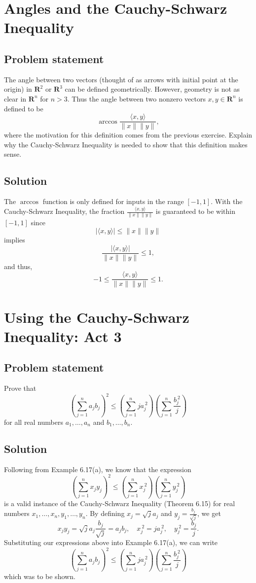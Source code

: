 \documentclass{article}
\providecommand{\abs}[1]{\lvert#1\rvert} \providecommand{\norm}[1]{\lVert#1\rVert}
\begin{document}
\clearpage

\section{Angles and the Cauchy-Schwarz Inequality}
\subsection*{Problem statement}
The angle between two vectors (thought of as arrows with initial point at the origin) in $\mathbf{R}^2$ or $\mathbf{R}^3$ can be defined geometrically. 
However, geometry is not as clear in $\mathbf{R}^n$ for $n>3$. 
Thus the angle between two nonzero vectors $x,y\in\mathbf{R}^n$ is defined to be
\[\arccos\frac{\langle x,y\rangle}{\norm{x}\norm{y}},\]
where the motivation for this definition comes from the previous exercise. 
Explain why the Cauchy-Schwarz Inequality is needed to show that this definition makes sense.

\subsection*{Solution}
The $\arccos$ function is only defined for inputs in the range $[-1,1]$. 
With the Cauchy-Schwarz Inequality, the fraction $\frac{\langle x,y\rangle}{\norm{x}\norm{y}}$ is guaranteed to be within $[-1,1]$ since
\[\abs{\langle x,y\rangle} \leq \norm{x}\norm{y}\]
implies
\[\frac{\abs{\langle x,y\rangle}}{\norm{x}\norm{y}}\leq 1,\]
and thus,
\[-1\leq \frac{\langle x,y\rangle}{\norm{x}\norm{y}} \leq 1.\]

\clearpage

\section{Using the Cauchy-Schwarz Inequality: Act 3}
\subsection*{Problem statement}
Prove that
\[(\sum^{n}_{j=1}a_jb_j)^2\leq (\sum^{n}_{j=1}ja_j^{\:2})(\sum^{n}_{j=1}\frac{b_j^{\:2}}{j})\]
for all real numbers $a_1,\ldots,a_n$ and $b_1,\ldots,b_n$.

\subsection*{Solution}
Following from Example 6.17(a), we know that the expression
\[(\sum^{n}_{j=1}x_jy_j)^2\leq (\sum^{n}_{j=1}x_j^{\:2})(\sum^{n}_{j=1}y_j^{\:2})\]
is a valid instance of the Cauchy-Schwarz Inequality (Theorem 6.15) for real numbers $x_1,\ldots,x_n,y_1,\ldots,y_n$. 
By defining $x_j=\sqrt{j}a_j$ and $y_j=\frac{b_j}{\sqrt{j}}$, we get
\[x_jy_j=\sqrt{j}a_j\frac{b_j}{\sqrt{j}}=a_jb_j,\quad x_j^{\:2}=ja_j^{\:2},\quad y_j^{\:2}=\frac{b_j}{j}.\]
Substituting our expressions above into Example 6.17(a), we can write
\[(\sum^{n}_{j=1}a_jb_j)^2\leq (\sum^{n}_{j=1}ja_j^{\:2})(\sum^{n}_{j=1}\frac{b_j^{\:2}}{j})\]
which was to be shown.
\end{document}
